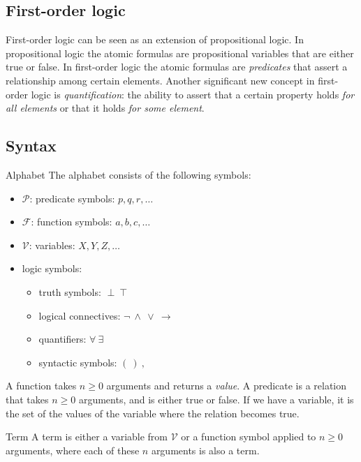 \documentclass{article}
\begin{document}
\clearpage
\subsection{First-order logic}

First-order logic can be seen as an extension of propositional logic. In
propositional logic the atomic formulas are propositional variables that are
either true or false. In first-order logic the atomic formulas are
\textit{predicates} that assert a relationship among certain elements. Another
significant new concept in first-order logic is \textit{quantification}: the
ability to assert that a certain property holds \textit{for all elements} or
that it holds \textit{for some element}.

\subsection*{Syntax}
\begin{Definition}{Alphabet}{}\label{fol_alphabet}
    The alphabet consists of the following symbols:
    \begin{itemize}
        \item $\mathcal{P}$: predicate symbols: $p,q,r,\ldots$
        \item $\mathcal{F}$: function symbols: $a,b,c,\ldots$
        \item $\mathcal{V}$: variables: $X,Y,Z,\ldots$
        \item logic symbols:
        \begin{itemize}
            \item truth symbols: $\perp\ \top$
            \item logical connectives: $\neg\ \land\ \lor\ \to$
            \item quantifiers: $\forall\ \exists$
            \item syntactic symbols: $(\ )\ ,$
        \end{itemize}
    \end{itemize}
\end{Definition}
A function takes $n\geq0$ arguments and returns a \textit{value}. A predicate
is a relation that takes $n\geq0$ arguments, and is either true or false. If
we have a variable, it is the set of the values of the variable where the
relation becomes true.
\begin{Definition}{Term}{}
    A term is either a variable from $\mathcal{V}$ or a function symbol
    applied to $n\geq0$ arguments, where each of these $n$ arguments is also a
    term.
\end{Definition}
\end{document}
